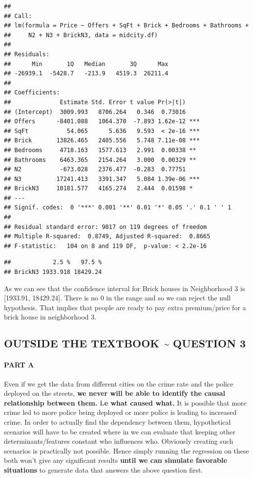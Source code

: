 \documentclass[
]{article}
\begin{document}
\begin{verbatim}
## 
## Call:
## lm(formula = Price ~ Offers + SqFt + Brick + Bedrooms + Bathrooms + 
##     N2 + N3 + BrickN3, data = midcity.df)
## 
## Residuals:
##      Min       1Q   Median       3Q      Max 
## -26939.1  -5428.7   -213.9   4519.3  26211.4 
## 
## Coefficients:
##              Estimate Std. Error t value Pr(>|t|)    
## (Intercept)  3009.993   8706.264   0.346  0.73016    
## Offers      -8401.088   1064.370  -7.893 1.62e-12 ***
## SqFt           54.065      5.636   9.593  < 2e-16 ***
## Brick       13826.465   2405.556   5.748 7.11e-08 ***
## Bedrooms     4718.163   1577.613   2.991  0.00338 ** 
## Bathrooms    6463.365   2154.264   3.000  0.00329 ** 
## N2           -673.028   2376.477  -0.283  0.77751    
## N3          17241.413   3391.347   5.084 1.39e-06 ***
## BrickN3     10181.577   4165.274   2.444  0.01598 *  
## ---
## Signif. codes:  0 '***' 0.001 '**' 0.01 '*' 0.05 '.' 0.1 ' ' 1
## 
## Residual standard error: 9817 on 119 degrees of freedom
## Multiple R-squared:  0.8749, Adjusted R-squared:  0.8665 
## F-statistic:   104 on 8 and 119 DF,  p-value: < 2.2e-16
\end{verbatim}

\begin{verbatim}
##            2.5 %   97.5 %
## BrickN3 1933.918 18429.24
\end{verbatim}

As we can see that the confidence interval for Brick houses in
Neighborhood 3 is {[}1933.91, 18429.24{]}. There is no 0 in the range
and so we can reject the null hypothesis. That implies that people are
ready to pay extra premium/price for a brick house in neighborhood 3.

\hypertarget{outside-the-textbook-question-3}{%
\subsection{OUTSIDE THE TEXTBOOK \textasciitilde{} QUESTION
3}\label{outside-the-textbook-question-3}}

\hypertarget{part-a-8}{%
\paragraph{PART A}\label{part-a-8}}

Even if we get the data from different cities on the crime rate and the
police deployed on the streets, \textbf{we never will be able to
identify the causal relationship between them. i.e what caused what.} It
is possible that more crime led to more police being deployed or more
police is leading to increased crime. In order to actually find the
dependency between them, hypothetical scenarios will have to be created
where in we can evaluate that keeping other determinants/features
constant who influences who. Obviously creating such scenarios is
practically not possible. Hence simply running the regression on these
both won't give any significant results \textbf{until we can simulate
favorable situations} to generate data that answers the above question
first.
\end{document}
